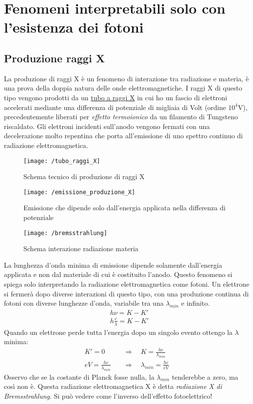 

\section{Fenomeni interpretabili solo con l'esistenza dei fotoni}


\subsection{Produzione raggi X}
La produzione di raggi X è un fenomeno di interazione tra radiazione e materia, è una prova della doppia natura delle onde elettromagnetiche.
I raggi X di questo tipo vengono prodotti da un \underline{tubo a raggi X} in cui ho un fascio di elettroni accelerati mediante una differenza di potenziale di migliaia di Volt (ordine $10^4$V), precedentemente liberati per \textit{effetto termoionico} da un filamento di Tungsteno riscaldato.
Gli elettroni incidenti sull'anodo vengono fermati con una decelerazione molto repentina che porta all'emissione di uno spettro continuo di radiazione elettromagnetica.
\begin{figure}[h]
\centering
\texttt{[image: /tubo\_raggi\_X]}
\caption{Schema tecnico di produzione di raggi X}
\end{figure}
\begin{figure}[h]
\centering
\texttt{[image: /emissione\_produzione\_X]}
\caption{Emissione che dipende solo dall'energia applicata nella differenza di potenziale}
\end{figure}
\begin{figure}[h]
\centering
\texttt{[image: /bremsstrahlung]}
\caption{Schema interazione radiazione materia}
\end{figure}

La lunghezza d'onda minima di emissione dipende solamente dall'energia applicata e non dal materiale di cui è costituito l'anodo.
Questo fenomeno si spiega solo interpretando la radiazione elettromagnetica come fotoni.
Un elettrone si fermerà dopo diverse interazioni di questo tipo, con una produzione continua di fotoni con diverse lunghezze d'onda,
variabile tra una $\lambda_{min}$ e infinito.
\begin{equation}
\begin{split}
& h\nu = K - K' \\
& h \frac{ c}{\lambda } = K - K'
\end{split}
\end{equation}
Quando un elettrone perde tutta l'energia dopo un singolo evento ottengo la $\lambda$ minima:
\begin{equation}
\begin{split}
K' = 0 \quad & \Rightarrow \quad K = \frac{ hc}{\lambda_{min} } \\
eV = \frac{ hc}{\lambda_{min} } \quad & \Rightarrow \quad \lambda_{min} = \frac{ hc}{eV }
\end{split}
\end{equation}
Osservo che se la costante di Planck fosse nulla, la $\lambda_{min}$ tenderebbe a zero, ma così non è.
Questa radiazione elettromagnetica X è detta \textit{radiazione X di Bremsstrahlung}.
Si può vedere come l'inverso dell'effetto fotoelettrico!


